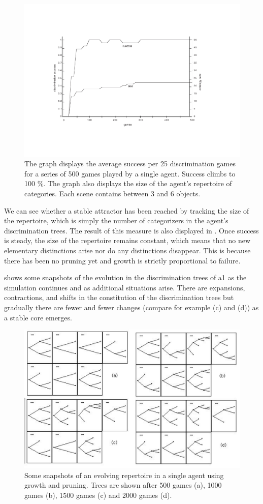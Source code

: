 \begin{figure}[htbp]
  \centerline{\includegraphics[width=.70\textwidth]{chap4/figs/avsuc}}
\caption{\label{avsuc} The graph displays the 
average success per 25 discrimination games for a
series of 500 games played by a single agent. Success climbs
to 100 \%. The graph also displays the size of the 
agent's repertoire of categories. Each scene contains
between 3 and 6 objects.}
\end{figure}

We can see whether a stable attractor has been reached by 
tracking the size of the repertoire, which is
simply the number of 
categorizers in the agent's discrimination trees. 
The result of this measure is also displayed in 
. Once success is steady, the
size of the repertoire remains 
constant, which means that no new 
elementary distinctions arise nor do any distinctions
disappear. This is because there has been no pruning yet and 
growth is strictly proportional to failure. 

 shows some snapshots of the 
evolution in the discrimination trees of {\bfshape a1} as
the simulation continues and as additional situations
arise. There are
expansions, contractions, and shifts in the constitution of the 
discrimination trees but gradually there are fewer and 
fewer changes (compare for example (c) and (d)) as a
stable core emerges. 

\begin{figure}[htbp]
  \centerline{\includegraphics[width=.75\textwidth]{chap4/figs/dynatrees}}
\caption{\label{dyna-trees} Some snapshots of an evolving 
repertoire in a single agent using growth and pruning. 
Trees are shown after 500 games (a), 1000 games (b), 1500 games
(c) and 2000 games (d).} 
\end{figure}


